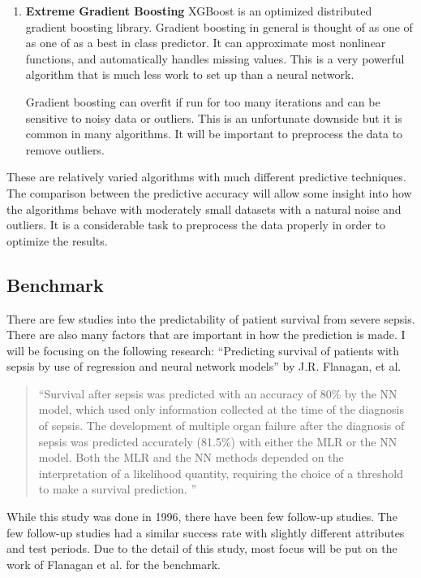 \documentclass[11pt]{article}
\begin{document}
\begin{enumerate}
		\item \textbf{Extreme Gradient Boosting} XGBoost is an optimized distributed gradient boosting library. Gradient boosting in general is thought of as one of as one of as a best in class predictor. It can approximate most nonlinear functions, and automatically handles missing values. This is a very powerful algorithm that is much less work to set up than a neural network.
		
		Gradient boosting can overfit if run for too many iterations and can be sensitive to noisy data or outliers. This is an unfortunate downside but it is common in many algorithms. It will be important to preprocess the data to remove outliers.
	\end{enumerate}
	
	These are relatively varied algorithms with much different predictive techniques. The comparison between the predictive accuracy will allow some insight into how the algorithms behave with moderately small datasets with a natural noise and outliers. It is a considerable task to preprocess the data properly in order to optimize the results.
	
	\subsection{Benchmark}
	There are few studies into the predictability of patient survival from severe sepsis. There are also many factors that are important in how the prediction is made. I will be focusing on the following research: ``Predicting survival of patients with sepsis by use of regression and neural network models'' by J.R. Flanagan, et al. 
	\begin{quotation}
		``Survival after sepsis was predicted with an accuracy of 80\% by the NN model, which used only information collected at the time of the diagnosis of sepsis. The development of multiple organ failure after the diagnosis of sepsis was predicted accurately (81.5\%) with either the MLR or the NN model. Both the MLR and the NN methods depended on the interpretation of a likelihood quantity, requiring the choice of a threshold to make a survival prediction. ''\cite{sepsisresearch}
	\end{quotation}
	
	While this study was done in 1996, there have been few follow-up studies. The few follow-up studies had a similar success rate with slightly different attributes and test periods. Due to the detail of this study, most focus will be put on the work of Flanagan et al. for the benchmark.
	
\end{document}
